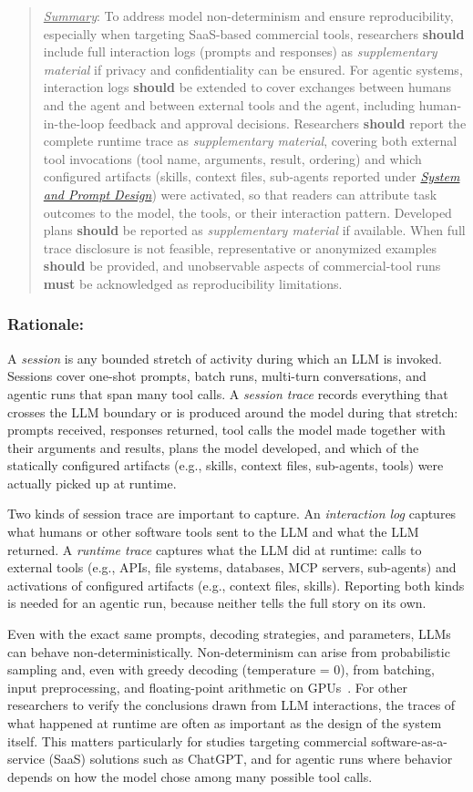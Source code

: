 \documentclass[smallextended]{svjour3}
\newcommand{\must}{\textbf{must}\xspace}
\newcommand{\should}{\textbf{should}\xspace}
\newcommand{\summary}{\underline{\emph{Summary}}\xspace}
\newcommand{\summary}{\textbf{\emph{Summary}}\xspace}
\newcommand{\supplementarymaterial}{\emph{supplementary material}\xspace}
\newcommand{\supplementarymaterial}{\emph{supplementary material}\xspace}
\newenvironment{framed}{\begin{quote}}{\end{quote}}
\newcommand{\design}{\hyperref[sec:report-system-and-prompt-design]{\emph{System and Prompt Design}}\xspace}
\newcommand{\design}{\href{/guidelines\#report-system-and-prompt-design}{\emph{System and Prompt Design}}\xspace}
\newcommand{\guidelinesubsubsection}[1]{\subsubsection{\bfseries #1:}}
\newcommand{\guidelinesubsubsection}[1]{\subsubsection{#1}}
\begin{document}
\vspace{0.5\baselineskip}
\begin{framed}
\summary: To address model non-determinism and ensure reproducibility, especially when targeting SaaS-based commercial tools, researchers \should include full interaction logs (prompts and responses) as \supplementarymaterial if privacy and confidentiality can be ensured. For agentic systems, interaction logs \should be extended to cover exchanges between humans and the agent and between external tools and the agent, including human-in-the-loop feedback and approval decisions. Researchers \should report the complete runtime trace as \supplementarymaterial, covering both external tool invocations (tool name, arguments, result, ordering) and which configured artifacts (skills, context files, sub-agents reported under \design) were activated, so that readers can attribute task outcomes to the model, the tools, or their interaction pattern. Developed plans \should be reported as \supplementarymaterial if available. When full trace disclosure is not feasible, representative or anonymized examples \should be provided, and unobservable aspects of commercial-tool runs \must be acknowledged as reproducibility limitations.
 \end{framed}

\guidelinesubsubsection{Rationale}

A \emph{session} is any bounded stretch of activity during which an LLM is invoked. Sessions cover one-shot prompts, batch runs, multi-turn conversations, and agentic runs that span many tool calls.
A \emph{session trace} records everything that crosses the LLM boundary or is produced around the model during that stretch: prompts received, responses returned, tool calls the model made together with their arguments and results, plans the model developed, and which of the statically configured artifacts (e.g., skills, context files, sub-agents, tools) were actually picked up at runtime.

Two kinds of session trace are important to capture.
An \emph{interaction log} captures what humans or other software tools sent to the LLM and what the LLM returned.
A \emph{runtime trace} captures what the LLM did at runtime: calls to external tools (e.g., APIs, file systems, databases, MCP servers, sub-agents) and activations of configured artifacts (e.g., context files, skills). Reporting both kinds is needed for an agentic run, because neither tells the full story on its own.

Even with the exact same prompts, decoding strategies, and parameters, LLMs can behave non-deterministically.
Non-determinism can arise from probabilistic sampling and, even with greedy decoding (temperature = 0), from batching, input preprocessing, and floating-point arithmetic on GPUs~\cite{Chann2023}.
For other researchers to verify the conclusions drawn from LLM interactions, the traces of what happened at runtime are often as important as the design of the system itself.
This matters particularly for studies targeting commercial software-as-a-service (SaaS) solutions such as ChatGPT, and for agentic runs where behavior depends on how the model chose among many possible tool calls.
\end{document}
